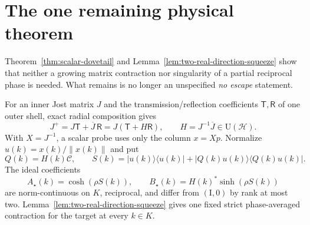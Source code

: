 \documentclass[11pt]{article}
\theoremstyle{remark}
\newcommand{\Id}{\mathrm I}
\newcommand{\U}{\mathrm U}
\begin{document}
\section{The one remaining physical theorem}

Theorem~\ref{thm:scalar-dovetail} and
Lemma~\ref{lem:two-real-direction-squeeze} show that neither a growing matrix
contraction nor singularity of a partial reciprocal phase is needed.  What
remains is no longer an unspecified \emph{no escape} statement.

For an inner Jost matrix $J$ and the transmission/reflection coefficients
$\mathsf T,\mathsf R$ of one outer shell, exact radial composition gives
\begin{equation}
 J^+=J\mathsf T+\overline J\,\mathsf R
 =J(\mathsf T+H\mathsf R),
 \qquad H=J^{-1}\overline J\in\U(\mathcal H).
 \label{eq:exact-jost-shell-update}
\end{equation}
With $X=J^{-1}$, a scalar probe uses only the column $x=Xp$.  Normalize
$u(k)=x(k)/\|x(k)\|$ and put
\begin{equation}
 Q(k)=H(k)\mathcal C,\qquad
 S(k)=|u(k)\rangle\langle u(k)|
      +|Q(k)u(k)\rangle\langle Q(k)u(k)|.
 \label{eq:moving-two-real-family}
\end{equation}
The ideal coefficients
\begin{equation}
 A_\star(k)=\cosh(\rho S(k)),\qquad
 B_\star(k)=H(k)^*\sinh(\rho S(k))
 \label{eq:broadband-target-pair}
\end{equation}
are norm-continuous on $K$, reciprocal, and differ from $(\Id,0)$ by rank at
most two.  Lemma~\ref{lem:two-real-direction-squeeze} gives one fixed strict
phase-averaged contraction for the target at every $k\in K$.
\end{document}

